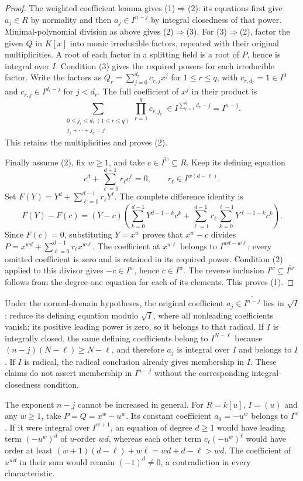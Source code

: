 \begin{proof}
The weighted coefficient lemma gives (1)$\Rightarrow$(2):
its equations first give $a_j\in R$ by normality and then
$a_j\in I^{n-j}$ by integral closedness of that power.
Minimal-polynomial division as above gives (2)$\Rightarrow$(3).
For (3)$\Rightarrow$(2), factor the given $Q$ in $K[x]$
into monic irreducible factors, repeated with their original
multiplicities. A root of each factor in a splitting field
is a root of $P$, hence is integral over $I$. Condition (3)
gives the required powers for each irreducible factor.
Write the factors as
$Q_r=\sum_{j=0}^{d_r}c_{r,j}x^j$ for $1\leq r\leq q$,
with $c_{r,d_r}=1\in I^0$ and
$c_{r,j}\in I^{d_r-j}$ for $j<d_r$.
The full coefficient of $x^j$ in their product is
$$
\sum_{\substack{0\leq j_r\leq d_r\ (1\leq r\leq q)\\
                 j_1+\cdots+j_q=j}}
\prod_{r=1}^q c_{r,j_r}
\ \in I^{\sum_{r=1}^qd_r-j}=I^{n-j}.
$$
This retains the multiplicities and proves (2).

Finally assume (2), fix $w\geq1$, and take
$c\in\overline{I^w}\subseteq R$. Keep its defining equation
$$
c^d+\sum_{\ell=0}^{d-1}r_\ell c^\ell=0,
\qquad r_\ell\in I^{w(d-\ell)}.
$$
Set $F(Y)=Y^d+\sum_{\ell=0}^{d-1}r_\ell Y^\ell$.
The complete difference identity is
$$
F(Y)-F(c)=(Y-c)\left(
\sum_{k=0}^{d-1}Y^{d-1-k}c^k+
\sum_{\ell=1}^{d-1}r_\ell
   \sum_{k=0}^{\ell-1}Y^{\ell-1-k}c^k\right).
$$
Since $F(c)=0$, substituting $Y=x^w$ proves that $x^w-c$
divides
$P=x^{wd}+\sum_{\ell=0}^{d-1}r_\ell x^{w\ell}$.
The coefficient at $x^{w\ell}$ belongs to $I^{wd-w\ell}$;
every omitted coefficient is zero and is retained in its
required power. Condition (2) applied to this divisor gives
$-c\in I^w$, hence $c\in I^w$. The reverse inclusion
$I^w\subseteq\overline{I^w}$ follows from the degree-one
equation for each of its elements. This proves (1).
\end{proof}

\begin{remark}
\label{editorial-source-remark-weighted-coefficient-consequences}
Under the normal-domain hypotheses, the original coefficient
$a_j\in\overline{I^{n-j}}$ lies in $\sqrt I$: reduce its
defining equation modulo $\sqrt I$, where all nonleading
coefficients vanish; its positive leading power is zero, so
it belongs to that radical. If $I$ is integrally closed,
the same defining coefficients belong to $I^{N-\ell}$
because $(n-j)(N-\ell)\geq N-\ell$, and therefore $a_j$
is integral over $I$ and belongs to $I$. If $I$ is radical,
the radical conclusion already gives membership in $I$.
These claims do not assert membership in $I^{n-j}$ without
the corresponding integral-closedness condition.

The exponent $n-j$ cannot be increased in general.
For $R=k[u]$, $I=(u)$ and any $w\geq1$, take
$P=Q=x^w-u^w$. Its constant coefficient $a_0=-u^w$
belongs to $I^w$. If it were integral over $I^{w+1}$,
an equation of degree $d\geq1$ would have leading term
$(-u^w)^d$ of $u$-order $wd$, whereas each other term
$c_\ell(-u^w)^\ell$ would have order at least
$(w+1)(d-\ell)+w\ell=wd+d-\ell>wd$.
The coefficient of $u^{wd}$ in their sum would remain
$(-1)^d\ne0$, a contradiction in every characteristic.
\end{remark}